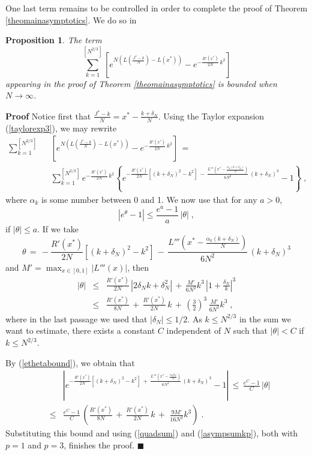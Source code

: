 \documentclass[12pt]{article}
\newtheorem{proposition}{Proposition}
\begin{document}
One last term remains to be controlled in order to complete the proof of Theorem \ref{theomainasymptotics}. We do so in
\begin{proposition} \label{properrorTaylor}
The term
\[\sum_{k=1}^{[ N^{2/3}]} \left[e^{N(L(\frac{J^{\ast}-k}{N})-L(x^{\ast}))}- e^{-\frac{R'(x^{\ast})}{2N} \, k^2}\right]\]
appearing in the proof of Theorem \ref{theomainasymptotics} is bounded when $N \rightarrow \infty$.
\end{proposition}

\textbf{Proof}
Notice first that $\frac{J^{\ast}-k}{N}= x^{\ast}- \frac{k+\delta_N}{N}$. Using the Taylor expansion (\ref{taylorexp3}), we may rewrite
\begin{eqnarray}
\sum_{k=1}^{[ N^{2/3}]} &&\left[e^{N(L(\frac{J^{\ast}-k}{N})-L(x^{\ast}))}- e^{-\frac{R'(x^{\ast})}{2N} \, k^2}\right]\,=\, \nonumber\\ &&\sum_{k=1}^{[ N^{2/3}]} e^{-\frac{R'(x^{\ast})}{2N} \, k^2} \left\{e^{-\frac{R'(x^{\ast})}{2N} [(k+\delta_N)^2-k^2] \,-\, \frac{L'''(x^{\ast}-\frac{\alpha_k (k+\delta_N)}{N})}{6N^2} \, (k+\delta_N)^3}-1 \right\} \;,\nonumber
\end{eqnarray}
where $\alpha_k$ is some number between 0 and 1.
We now use that for any $a>0$, 
\begin{equation}  \label{ethetabound}
|e^{\theta}-1| \leq \frac{e^a-1}{a} \,|\theta| \;,
\end{equation} 
if $|\theta| \leq a$. If we take 
\[\theta\,=\, -\frac{R'(x^{\ast})}{2N} [(k+\delta_N)^2-k^2] \,-\, \frac{L'''(x^{\ast}-\frac{\alpha_k (k+\delta_N)}{N})}{6N^2} \, (k+\delta_N)^3\]
and $M'=\max_{x \in[0,1]}|L'''(x)|$, then
\begin{eqnarray}
|\theta|&\leq & \frac{R'(x^{\ast})}{2N} \, |2\delta_N k+\delta_N^2| \,+\, \frac{M'}{6N^2} k^3 \, |1+\frac{\delta_N}{k}|^3 \nonumber\\
&\leq& \frac{R'(x^{\ast})}{8N} \,+\, \frac{R'(x^{\ast})}{2N}  \, k\,+\, \left(\frac{3}{2}\right)^3 \, \frac{M'}{6N^2} k^3 \nonumber \;,
\end{eqnarray}
where in the last passage we used that $|\delta_N|\leq 1/2$. As $k \leq N^{2/3}$ in the sum we want to estimate, there exists a constant $C$ independent of $N$ such that
$|\theta|<C$ if $k \leq N^{2/3}$.

By (\ref{ethetabound}), we obtain
that
\begin{eqnarray}
&&\left|e^{-\frac{R'(x^{\ast})}{2N} [(k+\delta_N)^2-k^2] \,+\, \frac{L'''(x^{\ast}-\frac{\alpha_k \delta_N}{N})}{6N^2} \, (k+\delta_N)^3}-1\right| \,\leq\, \frac{e^C-1}{C} \, |\theta| \nonumber\\
&\leq&  \frac{e^C-1}{C} \, \left(\frac{R'(x^{\ast})}{8N} \,+\, \frac{R'(x^{\ast})}{2N}  \, k\,+\,  \, \frac{9M'}{16N^2} k^3 \right) \;.\nonumber 
\end{eqnarray}
Substituting this bound and using (\ref{quadsum}) and (\ref{asympsumkp}), both with $p=1$ and $p=3$, finishes the proof.
$\blacksquare$
\end{document}
